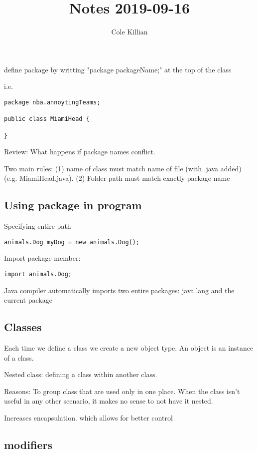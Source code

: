 \documentclass{article}
\begin{document}
\title{Notes 2019-09-16}
\author{Cole Killian}

\maketitle

define package by writting "package packageName;" at the top of the class

i.e. 
\begin{lstlisting}
package nba.annoytingTeams;

public class MiamiHead {

}
\end{lstlisting}

Review: What happens if package names conflict.

Two main rules: (1) name of class must match name of file (with .java added) (e.g. MiamiHead.java). (2) Folder path must match exactly package name 

\subsection*{Using package in program}
Specifying entire path
\begin{lstlisting}
animals.Dog myDog = new animals.Dog();
\end{lstlisting}
Import package member:
\begin{lstlisting}
import animals.Dog;
\end{lstlisting}

Java compiler automatically imports two entire packages: java.lang and the current package

\subsection*{Classes}

Each time we define a class we create a new object type. An object is an instance of a class.

Nested class: defining a class within another class.

Reasons: To group class that are used only in one place.
When the class isn't useful in any other scenario, it makes no sense to not have it nested.

Increases encapsulation. which allows for better control

\subsection*{modifiers}
\end{document}
